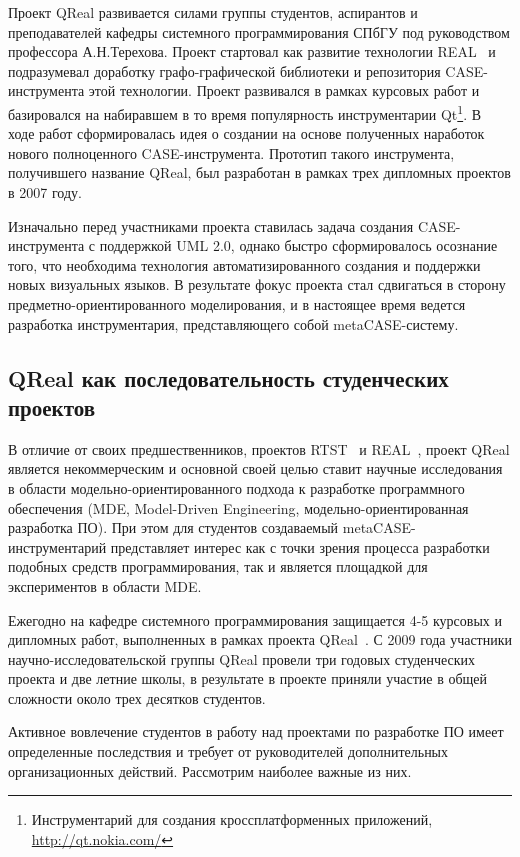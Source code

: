 \documentclass[a4paper]{article}
\begin{document}
Проект QReal развивается силами группы студентов, аспирантов и преподавателей кафедры системного программирования СПбГУ под руководством профессора А.Н.Терехова. Проект стартовал как развитие технологии REAL~\cite{real} и подразумевал доработку графо-графической библиотеки и репозитория CASE-инструмента этой технологии. Проект развивался в рамках курсовых работ и базировался на набиравшем в то время популярность инструментарии Qt\footnote{Инструментарий для создания кроссплатформенных приложений, \url{http://qt.nokia.com/}}. В ходе работ сформировалась идея о создании на основе полученных наработок нового полноценного CASE-инструмента. Прототип такого инструмента, получившего название QReal, был разработан в рамках трех дипломных проектов в 2007 году. 

Изначально перед участниками проекта ставилась задача создания CASE-инструмента с поддержкой UML 2.0, однако быстро сформировалось осознание того, что необходима технология автоматизированного создания и поддержки новых визуальных языков. В результате фокус проекта стал сдвигаться в сторону предметно-ориентированного моделирования, и в настоящее время ведется разработка инструментария, представляющего собой metaCASE-систему. 

\subsection{QReal как последовательность студенческих проектов}

В отличие от своих предшественников, проектов RTST~\cite{rtst} и REAL~\cite{real}, проект QReal является некоммерческим и основной своей целью ставит научные исследования в области модельно-ориентированного подхода к разработке программного обеспечения (MDE, Model-Driven Engineering, модельно-ориентированная разработка ПО). При этом для студентов создаваемый metaCASE-инструментарий представляет интерес как с точки зрения процесса разработки подобных средств программирования, так и является площадкой для экспериментов в области MDE. 

Ежегодно на кафедре системного программирования защищается 4-5 курсовых и дипломных работ, выполненных в рамках проекта QReal~\cite{termPapers}. С 2009 года участники научно-исследовательской группы QReal провели три годовых студенческих проекта и две летние школы, в результате в проекте приняли участие в общей сложности около трех десятков студентов. 

Активное вовлечение студентов в работу над проектами по разработке ПО имеет определенные последствия и требует от руководителей дополнительных организационных действий. Рассмотрим наиболее важные из них.
\end{document}
